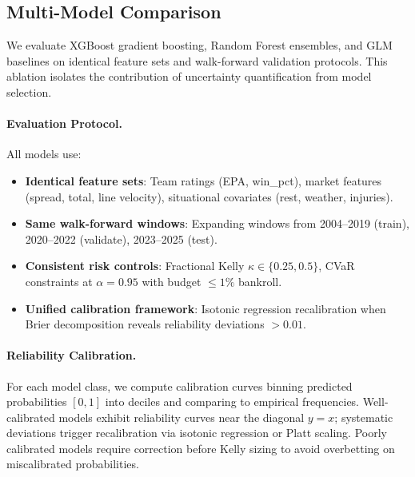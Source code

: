 \subsection{Multi-Model Comparison}\label{subsec:multi-model-comparison}
We evaluate XGBoost gradient boosting, Random Forest ensembles, and GLM baselines on identical feature sets and walk-forward validation protocols. This ablation isolates the contribution of uncertainty quantification from model selection.

\paragraph{Evaluation Protocol.}
All models use:
\begin{itemize}
  \item \textbf{Identical feature sets}: Team ratings (EPA, win\_pct), market features (spread, total, line velocity), situational covariates (rest, weather, injuries).
  \item \textbf{Same walk-forward windows}: Expanding windows from 2004--2019 (train), 2020--2022 (validate), 2023--2025 (test).
  \item \textbf{Consistent risk controls}: Fractional Kelly $\kappa \in \{0.25, 0.5\}$, CVaR constraints at $\alpha=0.95$ with budget $\le 1\%$ bankroll.
  \item \textbf{Unified calibration framework}: Isotonic regression recalibration when Brier decomposition reveals reliability deviations $>0.01$.
\end{itemize}

\paragraph{Reliability Calibration.}
For each model class, we compute calibration curves binning predicted probabilities $[0,1]$ into deciles and comparing to empirical frequencies. Well-calibrated models exhibit reliability curves near the diagonal $y=x$; systematic deviations trigger recalibration via isotonic regression or Platt scaling. Poorly calibrated models require correction before Kelly sizing to avoid overbetting on miscalibrated probabilities.

